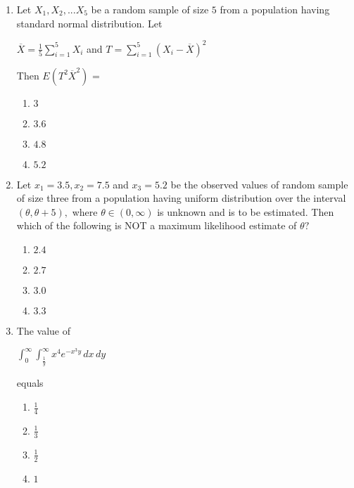 \documentclass[journal]{IEEEtran}
\theoremstyle{remark}
\begin{document}
\begin{enumerate}
                \item Let $X_1,X_2,...X_5$ be a random sample of size $5$ from a population having standard normal distribution. Let
                \begin{center}
                    $\overline{X} = \frac{1}{5}\sum_{i=1}^{5} X_i$ and $T = \sum_{i=1}^{5} (X_i-\overline{X})^2$
                \end{center}
                Then $E(T^2\overline{X}^2)$ =
                \begin{multicols}{4}
                \begin{enumerate}
                    \item $3$
                    \item $3.6$
                    \item $4.8$
                    \item $5.2$
                \end{enumerate}
                    
                \end{multicols}

                \item Let $x_1=3.5, x_2=7.5$ and $x_3=5.2$ be the observed values of random sample of size three from a population having uniform distribution over the interval $(\theta,\theta+5),$ where $\theta \in(0,\infty)$ is unknown and is to be estimated. Then which of the following is NOT a maximum likelihood estimate of $\theta ?$
                \begin{multicols}{4}
                \begin{enumerate}
                    \item $2.4$
                    \item $2.7$
                    \item $3.0$
                    \item $3.3$
                \end{enumerate}
                    
                \end{multicols}

                \item The value of 
                \begin{center}
                    $\int_{0}^{\infty} \int_{\frac{1}{y}}^{\infty} x^4 e^{-x^3 y} \, dx \, dy$
                \end{center}
                equals 
                \begin{multicols}{4}
                \begin{enumerate}
                    \item $\frac{1}{4}$
                    \item $\frac{1}{3}$
                     \item $\frac{1}{2}$
                     \item $1$
                \end{enumerate}
                    

\end{multicols}
\end{enumerate}
\end{document}
